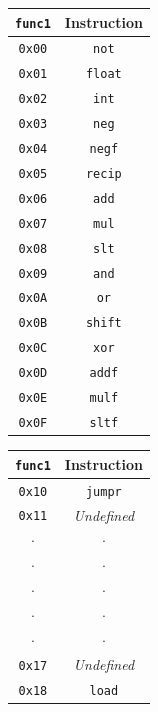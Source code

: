 \documentclass[sigconf, nonacm=true, screen=true]{acmart}
\begin{document}
\begin{center}
    \begin{table}[h]
    	\begin{tabular}[t]{cc}
            \toprule
            \texttt{func1} & Instruction \\
            \midrule
            \texttt{0x00} & \texttt{not} \\
            \texttt{0x01} & \texttt{float} \\
            \texttt{0x02} & \texttt{int} \\
            \texttt{0x03} & \texttt{neg} \\
            \texttt{0x04} & \texttt{negf} \\
            \texttt{0x05} & \texttt{recip} \\
            \texttt{0x06} & \texttt{add} \\
            \texttt{0x07} & \texttt{mul} \\
            \texttt{0x08} & \texttt{slt} \\
            \texttt{0x09} & \texttt{and} \\
            \texttt{0x0A} & \texttt{or} \\
            \texttt{0x0B} & \texttt{shift} \\
            \texttt{0x0C} & \texttt{xor} \\
            \texttt{0x0D} & \texttt{addf} \\
            \texttt{0x0E} & \texttt{mulf} \\
            \texttt{0x0F} & \texttt{sltf} \\
            \bottomrule
        \end{tabular}
    	\begin{tabular}[t]{cc}
            \toprule
            \texttt{func1} & Instruction \\
            \midrule
            \texttt{0x10} & \texttt{jumpr} \\
            \texttt{0x11} & \textit{Undefined} \\
            \(\cdot\) & \(\cdot\) \\
            \(\cdot\) & \(\cdot\) \\
            \(\cdot\) & \(\cdot\) \\
            \(\cdot\) & \(\cdot\) \\
            \(\cdot\) & \(\cdot\) \\
            \texttt{0x17} & \textit{Undefined} \\
            \texttt{0x18} & \texttt{load} \\

\end{tabular}
\end{table}
\end{center}
\end{document}
